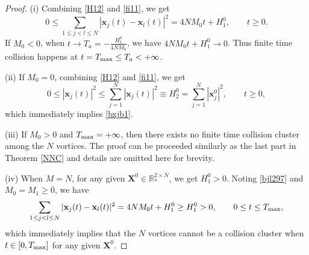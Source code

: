 \documentclass{aims}
\theoremstyle{plain}
\theoremstyle{definition}
\newcommand{\bx}{{\mathbf x}}
\newcommand{\bX}{{\mathbf X}}
\newcommand{\be} {\begin{equation}}
\newcommand{\ee}{\end{equation}}
\begin{document}
\begin{proof} (i) Combining \eqref{H12} and \eqref{fi11}, we get
\begin{equation} \label{bjl297}
0\le \sum_{1\leq j<l\leq
N}|\bx_j(t)-\bx_l(t)|^2=4NM_0t+H_1^0,\qquad t\ge0.
\end{equation}
If $M_0<0$, when $t\to T_a=-\frac{H_1^0}{4NM_0}$, we have
$4NM_0t+H_1^0\to 0$. Thus finite time collision happens at $t=T_{\rm max}\le T_a<+\infty$.


(ii) If $M_0=0$, combining \eqref{H12} and \eqref{fi11}, we get
\be
0\le |\bx_j(t)|^2\le \sum_{j=1}^N|\bx_j(t)|^2\equiv H_2^0=\sum_{j=1}^N|\bx_j^0|^2, \qquad t\ge0, \nonumber
\ee
which immediately implies \eqref{bxjb1}.

(iii) If $ M_0>0$ and $T_{\rm max}=+\infty$, then there exists no finite time collision cluster among the $N$ vortices. The proof can be proceeded
similarly as the last part in Theorem \ref{NNC} and details are omitted here for brevity.


(iv) When $M=N$, for any given $\bX^0\in {\mathbb R}_*^{2\times N}$,  we get $H_1^0>0$. Noting \eqref{bjl297} and $M_0=M_1\ge0$, we have
\[\sum_{1\leq j<l\leq
N}|\bx_j(t)-\bx_l(t)|^2=4NM_0t+H_1^0\ge H_1^0>0, \qquad 0\le t\le
T_{\rm max},
\]
which immediately implies that the $N$ vortices cannot be a
collision cluster when $t\in [0,T_{\rm max}]$ for any given $\bX^0$.


\end{proof}
\end{document}
